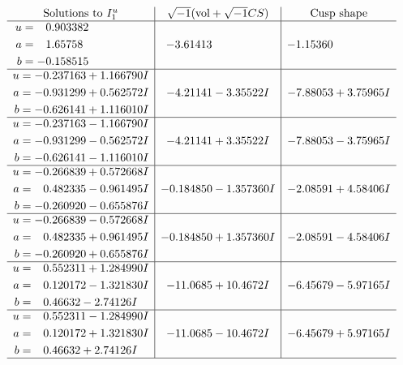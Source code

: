 \documentclass[1p]{elsarticle_modified}
\theoremstyle{definition}
\newcommand{\I}{\sqrt{-1}}
\begin{document}
$$\begin{array}{c|c|c}  
\text{Solutions to }I^u_{1}& \I (\text{vol} + \sqrt{-1}CS) & \text{Cusp shape}\\
 \hline 
\begin{aligned}
u &= \phantom{-}0.903382\phantom{ +0.000000I} \\
a &= \phantom{-}1.65758\phantom{ +0.000000I} \\
b &= -0.158515\phantom{ +0.000000I}\end{aligned}
 & -3.61413\phantom{ +0.000000I} & -1.15360\phantom{ +0.000000I} \\ \hline\begin{aligned}
u &= -0.237163 + 1.166790 I \\
a &= -0.931299 + 0.562572 I \\
b &= -0.626141 + 1.116010 I\end{aligned}
 & -4.21141 - 3.35522 I & -7.88053 + 3.75965 I \\ \hline\begin{aligned}
u &= -0.237163 - 1.166790 I \\
a &= -0.931299 - 0.562572 I \\
b &= -0.626141 - 1.116010 I\end{aligned}
 & -4.21141 + 3.35522 I & -7.88053 - 3.75965 I \\ \hline\begin{aligned}
u &= -0.266839 + 0.572668 I \\
a &= \phantom{-}0.482335 - 0.961495 I \\
b &= -0.260920 - 0.655876 I\end{aligned}
 & -0.184850 - 1.357360 I & -2.08591 + 4.58406 I \\ \hline\begin{aligned}
u &= -0.266839 - 0.572668 I \\
a &= \phantom{-}0.482335 + 0.961495 I \\
b &= -0.260920 + 0.655876 I\end{aligned}
 & -0.184850 + 1.357360 I & -2.08591 - 4.58406 I \\ \hline\begin{aligned}
u &= \phantom{-}0.552311 + 1.284990 I \\
a &= \phantom{-}0.120172 - 1.321830 I \\
b &= \phantom{-}0.46632 - 2.74126 I\end{aligned}
 & -11.0685 + 10.4672 I & -6.45679 - 5.97165 I \\ \hline\begin{aligned}
u &= \phantom{-}0.552311 - 1.284990 I \\
a &= \phantom{-}0.120172 + 1.321830 I \\
b &= \phantom{-}0.46632 + 2.74126 I\end{aligned}
 & -11.0685 - 10.4672 I & -6.45679 + 5.97165 I\\
 \hline 
 \end{array}$$\newpage\newpage\renewcommand{\arraystretch}{1}
\end{document}
